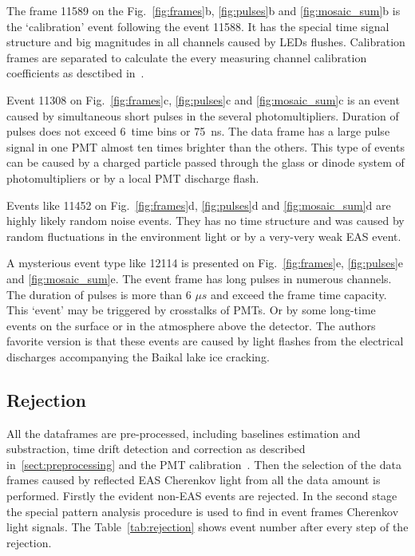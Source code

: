 \documentclass[final,5p,times,twocolumn]{elsarticle}
\begin{document}
The frame 11589 on the Fig.~\ref{fig:frames}b, \ref{fig:pulses}b and \ref{fig:mosaic_sum}b is the `calibration' event following the event 11588. It has the special time signal structure and big magnitudes in all channels caused by LEDs flushes. Calibration frames are separated to calculate the every measuring channel calibration coefficients as desctibed in~\cite{ant16}.

Event 11308 on Fig.~\ref{fig:frames}c, \ref{fig:pulses}c and \ref{fig:mosaic_sum}c is an event caused by simultaneous short pulses in the several photomultipliers. Duration of pulses does not exceed 6~time bins or 75~ns. The data frame has a large pulse signal in one PMT almost ten times brighter than the others. This type of events can be caused by a charged particle passed through the glass or dinode system of photomultipliers or by a local PMT discharge flash.  

Events like 11452 on Fig.~\ref{fig:frames}d, \ref{fig:pulses}d and \ref{fig:mosaic_sum}d are highly likely random noise events. They has no time structure and was caused by random fluctuations in the environment light or by a very-very weak EAS event. 

A mysterious event type like 12114 is presented on Fig.~\ref{fig:frames}e, \ref{fig:pulses}e and \ref{fig:mosaic_sum}e. The event frame has long pulses in numerous channels. The duration of pulses is more than 6 ${\mu}s$ and exceed the frame time capacity.  This `event' may be triggered by crosstalks of PMTs. Or by some long-time events on the surface or in the atmosphere above the detector. The authors favorite version is that these events are caused by light flashes from the electrical discharges accompanying the Baikal lake ice cracking.


\subsection{Rejection}

All the dataframes are pre-processed, including baselines estimation and substraction, time drift detection and correction as described in~\ref{sect:preprocessing} and the PMT calibration~\cite{ant16}. Then the  selection of the data frames caused by reflected EAS Cherenkov light from all the data amount is performed. Firstly the evident non-EAS events are rejected. In the second stage the special pattern analysis procedure is used to find in event frames Cherenkov light signals. The Table~\ref{tab:rejection} shows event number after every step of the rejection. 
\end{document}

